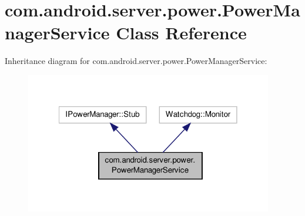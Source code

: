 \hypertarget{classcom_1_1android_1_1server_1_1power_1_1PowerManagerService}{\section{com.\-android.\-server.\-power.\-Power\-Manager\-Service Class Reference}
\label{classcom_1_1android_1_1server_1_1power_1_1PowerManagerService}
}


Inheritance diagram for com.\-android.\-server.\-power.\-Power\-Manager\-Service\-:
\nopagebreak
\begin{figure}[H]
\begin{center}
\leavevmode
\includegraphics[width=306pt]{classcom_1_1android_1_1server_1_1power_1_1PowerManagerService__inherit__graph}
\end{center}
\end{figure}


